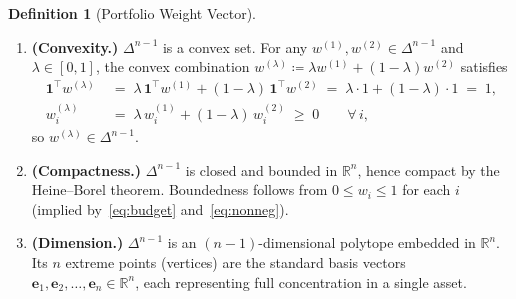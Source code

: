 \documentclass[12pt,openany]{book}
\newcommand{\R}{\mathbb{R}}
\newcommand{\bfw}{\mathbf{w}}
\newcommand{\bfe}{\mathbf{e}}
\newcommand{\bfone}{\mathbf{1}}
\numberwithin{equation}{chapter}
\theoremstyle{plain}
\theoremstyle{definition}
\newtheorem{definition}[theorem]{Definition}
\theoremstyle{remark}
\def\bfw{w}%
\begin{document}
\begin{definition}[Portfolio Weight Vector]
\begin{enumerate}[label=\textbf{(P\arabic*)}, leftmargin=*, widest=P3]
  \item \textbf{(Convexity.)}
        $\Delta^{n-1}$ is a convex set.
        For any $\bfw^{(1)}, \bfw^{(2)} \in \Delta^{n-1}$ and
        $\lambda \in [0,1]$, the convex combination
        $\bfw^{(\lambda)} \coloneqq \lambda\bfw^{(1)}
        + (1-\lambda)\bfw^{(2)}$ satisfies
        \begin{align}
          \bfone^\top \bfw^{(\lambda)}
          &\;=\; \lambda\,\bfone^\top\bfw^{(1)}
                 + (1-\lambda)\,\bfone^\top\bfw^{(2)}
          \;=\; \lambda \cdot 1 + (1-\lambda)\cdot 1
          \;=\; 1,
          \label{eq:simplex-convex-budget} \\
          w_i^{(\lambda)}
          &\;=\; \lambda\,w_i^{(1)} + (1-\lambda)\,w_i^{(2)}
          \;\geq\; 0
          \qquad \forall\, i,
          \label{eq:simplex-convex-nonneg}
        \end{align}
        so $\bfw^{(\lambda)} \in \Delta^{n-1}$.

  \item \textbf{(Compactness.)}
        $\Delta^{n-1}$ is closed and bounded in $\R^n$,
        hence compact by the Heine--Borel theorem.
        Boundedness follows from $0 \leq w_i \leq 1$
        for each $i$ (implied by~\eqref{eq:budget}
        and~\eqref{eq:nonneg}).

  \item \textbf{(Dimension.)}
        $\Delta^{n-1}$ is an $(n-1)$-dimensional polytope
        embedded in $\R^n$.
        Its $n$ extreme points (vertices) are the standard
        basis vectors $\bfe_1, \bfe_2, \ldots, \bfe_n \in \R^n$,
        each representing full concentration in a single asset.

\end{enumerate}
\end{definition}
\end{document}

